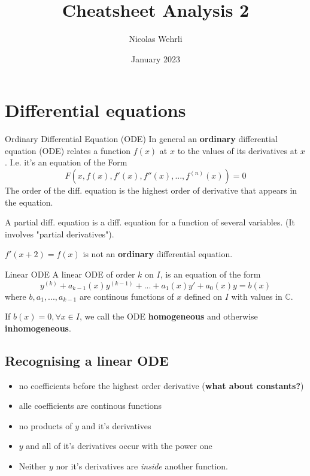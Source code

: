 \documentclass[a4paper,fontsize = 8pt]{scrartcl}
\title{Cheatsheet Analysis 2}
\author{Nicolas Wehrli}
\date{January 2023}
\def\C{\mathbb{C}}
\begin{document}
\maketitle

\section{Differential equations}
\begin{mainbox}{Ordinary Differential Equation (ODE)}
    In general an \textbf{ordinary} differential equation (ODE) relates a function $f(x)$ at $x$ to the values of its derivatives at $x$.
    I.e. it's an equation of the Form $$F(x, f(x), f'(x), f''(x), ..., f^{(n)}(x)) = 0$$ 
    The order of the diff. equation is the highest order of derivative that appears in the equation.

    A partial diff. equation is a diff. equation for a function of several variables. (It involves "partial derivatives").
\end{mainbox}
$f'(x+2) = f(x)$ is not an \textbf{ordinary} differential equation.

\begin{mainbox}{Linear ODE}
    A linear ODE of order $k$ on $I$, is an equation of the form $$y^{(k)} + a_{k-1}(x)y^{(k-1)}+...+a_1(x)y'+a_0(x)y = b(x)$$ 
    where $b, a_1, ..., a_{k-1}$ are continous functions of $x$ defined on $I$ with values in $\C$.

    If $b(x) = 0, \forall x \in I$, we call the ODE \textbf{homogeneous} and otherwise \textbf{inhomogeneous}. 
\end{mainbox}

\subsection*{Recognising a linear ODE}
\begin{itemize}
    \item no coefficients before the highest order derivative (\textbf{what about constants?})
    \item alle coefficients are continous functions
    \item no products of $y$ and it's derivatives
    \item $y$ and all of it's derivatives occur with the power one
    \item Neither $y$ nor it's derivatives are \textit{inside} another function.
\end{itemize}
\end{document}
